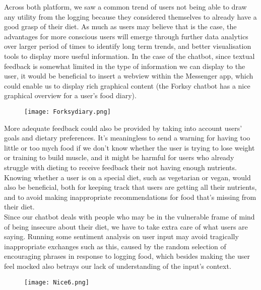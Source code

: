 Across both platform, we saw a common trend of users not being able to draw any utility from the logging because they considered themselves to already have a good grasp of their diet. As much as users may believe that is the case, the advantages for more conscious users will emerge through further data analytics over larger period of times to identify long term trends, and better visualisation tools to display more useful information. In the case of the chatbot, since textual feedback is somewhat limited in the type of information we can display to the user, it would be beneficial to insert a webview within the Messenger app, which could enable us to display rich graphical content (the Forksy chatbot has a nice graphical overview for a user's food diary). \\

\begin{figure}[h!]
  \centering
  \texttt{[image: Forksydiary.png]}
\end{figure} 

More adequate feedback could also be provided by taking into account users' goals and dietary preferences. It's meaningless to send a warning for having too little or too mych food if we don't know whether the user is trying to lose weight or training to build muscle, and it might be harmful for users who already struggle with dieting to receive feedback their not having enough nutrients. Knowing whether a user is on a special diet, such as vegetarian or vegan, would also be beneficial, both for keeping track that users are getting all their nutrients, and to avoid making inappropriate recommendations for food that's missing from their diet. \\
Since our chatbot deals with people who may be in the vulnerable frame of mind of being insecure about their diet, we have to take extra care of what users are saying. Running some sentiment analysis on user input may avoid tragically inappropriate exchanges such as this, caused by the random selection of encouraging phrases in response to logging food, which besides making the user feel mocked also betrays our lack of understanding of the input's context. \\

\begin{figure}[h!]
  \texttt{[image: Nice6.png]}
\end{figure}

